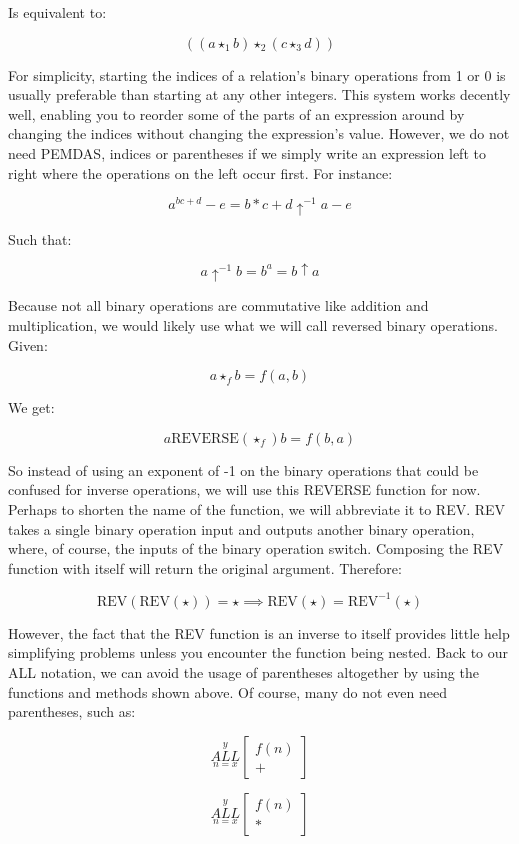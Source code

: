 \documentclass{article}
\begin{document}
Is equivalent to:

$$((a \star_1 b) \star_2 (c\star_3d))$$

For simplicity, starting the indices of a relation’s binary operations from 1 or 0 is usually preferable than starting at any other integers. This system works decently well, enabling you to reorder some of the parts of an expression around by changing the indices without changing the expression’s value. However, we do not need PEMDAS, indices or parentheses if we simply write an expression left to right where the operations on the left occur first. For instance:

$$a^{bc+d}-e=b*c+d \uparrow^{-1} a - e$$

Such that:

$$a \uparrow^{-1} b = b^a = b \uparrow a$$

Because not all binary operations are commutative like addition and multiplication, we would likely use what we will call reversed binary operations. Given:

$$a \star_f b = f(a,b)$$

We get:

$$a \text{REVERSE}(\star_f) b = f(b,a)$$

So instead of using an exponent of -1 on the binary operations that could be confused for inverse operations, we will use this REVERSE function for now. Perhaps to shorten the name of the function, we will abbreviate it to REV. REV takes a single binary operation input and outputs another binary operation, where, of course, the inputs of the binary operation switch. Composing the REV function with itself will return the original argument. Therefore:

$$\text{REV}(\text{REV}(\star))=\star \implies \text{REV}(\star) = \text{REV}^{-1}(\star)$$

However, the fact that the REV function is an inverse to itself provides little help simplifying problems unless you encounter the function being nested. Back to our ALL notation, we can avoid the usage of parentheses altogether by using the functions and methods shown above. Of course, many do not even need parentheses, such as:

$$\underset{n=x}{\overset{y}{ALL}}
\begin{bmatrix}
f(n) \\
+
\end{bmatrix}$$

$$\underset{n=x}{\overset{y}{ALL}}
\begin{bmatrix}
f(n) \\
*
\end{bmatrix}$$
\end{document}
